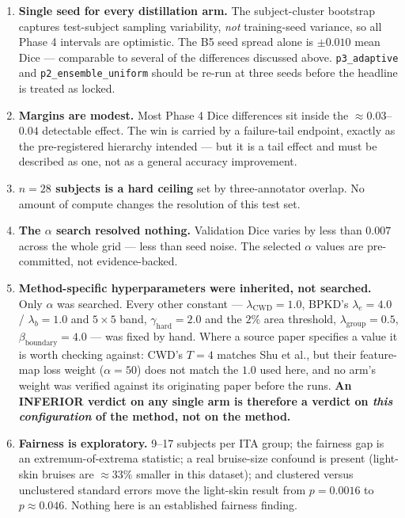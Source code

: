 \documentclass[11pt]{article}
\begin{document}
\begin{enumerate}[leftmargin=1.7em,itemsep=4pt]
  \item \textbf{Single seed for every distillation arm.} The subject-cluster bootstrap captures
  test-subject sampling variability, \emph{not} training-seed variance, so all Phase 4 intervals
  are optimistic. The B5 seed spread alone is $\pm0.010$ mean Dice --- comparable to several of
  the differences discussed above. \texttt{p3\_adaptive} and \texttt{p2\_ensemble\_uniform}
  should be re-run at three seeds before the headline is treated as locked.

  \item \textbf{Margins are modest.} Most Phase 4 Dice differences sit inside the
  $\approx0.03$--$0.04$ detectable effect. The win is carried by a failure-tail endpoint, exactly
  as the pre-registered hierarchy intended --- but it is a tail effect and must be described as
  one, not as a general accuracy improvement.

  \item \textbf{$n=28$ subjects is a hard ceiling} set by three-annotator overlap. No amount of
  compute changes the resolution of this test set.

  \item \textbf{The $\alpha$ search resolved nothing.} Validation Dice varies by less than $0.007$
  across the whole grid --- less than seed noise. The selected $\alpha$ values are pre-committed,
  not evidence-backed.

  \item \textbf{Method-specific hyperparameters were inherited, not searched.} Only $\alpha$ was
  searched. Every other constant --- $\lambda_{\mathrm{CWD}}=1.0$, BPKD's $\lambda_e=4.0$ /
  $\lambda_b=1.0$ and $5\times5$ band, $\gamma_{\text{hard}}=2.0$ and the $2\%$ area threshold,
  $\lambda_{\text{group}}=0.5$, $\beta_{\text{boundary}}=4.0$ --- was fixed by hand. Where a source
  paper specifies a value it is worth checking against: CWD's $T=4$ matches Shu et al., but their
  feature-map loss weight ($\alpha=50$) does not match the $1.0$ used here, and no arm's weight was
  verified against its originating paper before the runs. \textbf{An INFERIOR verdict on any single
  arm is therefore a verdict on \emph{this configuration} of the method, not on the method.}

  \item \textbf{Fairness is exploratory.} 9--17 subjects per ITA group; the fairness gap is an
  extremum-of-extrema statistic; a real bruise-size confound is present (light-skin bruises are
  $\approx33\%$ smaller in this dataset); and clustered versus unclustered standard errors move
  the light-skin result from $p=0.0016$ to $p\approx0.046$. Nothing here is an established
  fairness finding.


\end{enumerate}
\end{document}
